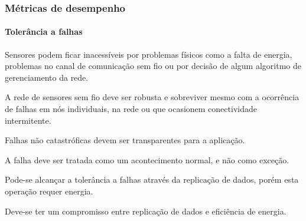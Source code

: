 \documentclass[notes]{beamer}
\begin{document}
\begin{frame}
\frametitle{Métricas de desempenho}
\framesubtitle{Tolerância a falhas}

\begin{block}

Sensores podem ficar inacessíveis por problemas físicos como a falta de energia, problemas no canal de comunicação sem fio ou por decisão de algum algoritmo de gerenciamento da rede.
\end{block} \pause

\begin{alertblock}

A rede de sensores sem fio deve ser robusta e sobreviver mesmo com a ocorrência de falhas em nós individuais, na rede ou que ocasionem conectividade intermitente. 
\end{alertblock} \pause

\begin{alertblock}

Falhas não catastróficas devem ser transparentes para a aplicação. 

\end{alertblock} \pause

\begin{alertblock}

A falha deve ser tratada como um acontecimento normal, e não como exceção.

\end{alertblock} \pause

\begin{block}

Pode-se alcançar a tolerância a falhas através da replicação de dados, porém esta operação requer energia. 
\end{block} \pause

\begin{block}
Deve-se ter um compromisso entre replicação de dados e eficiência de energia.

\end{block} 

\end{frame}
\end{document}

